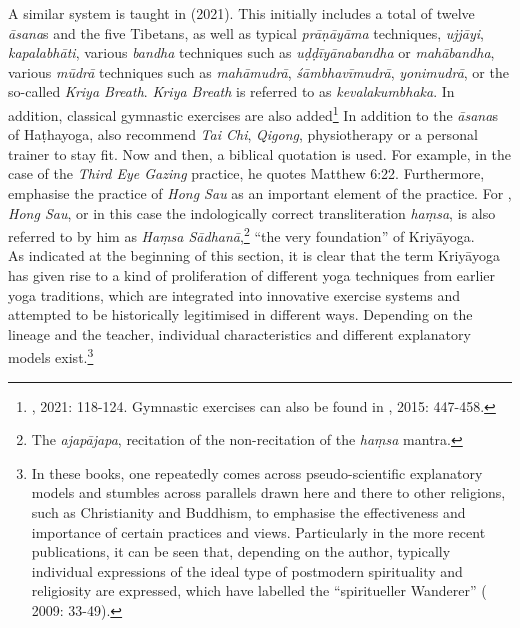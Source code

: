 A similar system is taught in \citeauthor{kriyayogalowenstein} (2021). This initially includes a total of twelve \textit{āsana}s and the five Tibetans, as well as typical \textit{prāṇāyāma} techniques, \textit{ujjāyi}, \textit{kapalabhāti}, various \textit{bandha} techniques such as \textit{uḍḍīyānabandha} or \textit{mahābandha}, various \textit{mūdrā} techniques such as \textit{mahāmudrā}, \textit{śāmbhavīmudrā}, \textit{yonimudrā}, or the so-called \textit{Kriya Breath}. \textit{Kriya Breath} is referred to as \textit{kevalakumbhaka}. In addition, classical gymnastic exercises are also added\footnote{\citeauthor{kriyayogalowenstein}, 2021: 118-124. Gymnastic exercises can also be found in \citeauthor{kriyayogasturgess2015}, 2015: 447-458.} In addition to the \textit{āsana}s of Haṭhayoga, \citeauthor{kriyayogalowenstein} also recommend \textit{Tai Chi}, \textit{Qigong}, physiotherapy or a personal trainer to stay fit. Now and then, a biblical quotation is used. For example, in the case of the \textit{Third Eye Gazing} practice, he quotes Matthew 6:22. Furthermore, \citeauthor{kriyayogalowenstein} emphasise the practice of \textit{Hong Sau} as an important element of the practice. For \citeauthor{kriyayoganityananda2013}, \textit{Hong Sau}, or in this case the indologically correct transliteration \textit{haṃsa}, is also referred to by him as \textit{Haṃsa Sādhanā},\footnote{The \textit{ajapājapa}, recitation of the non-recitation of the \textit{haṃsa} mantra.} ``the very foundation'' of Kriyāyoga.\\

As indicated at the beginning of this section, it is clear that the term Kriyāyoga has given rise to a kind of proliferation of different yoga techniques from earlier yoga traditions, which are integrated into innovative exercise systems and attempted to be historically legitimised in different ways. Depending on the lineage and the teacher, individual characteristics and different explanatory models exist.\footnote{In these books, one repeatedly comes across pseudo-scientific explanatory models and stumbles across parallels drawn here and there to other religions, such as Christianity and Buddhism, to emphasise the effectiveness and importance of certain practices and views. Particularly in the more recent publications, it can be seen that, depending on the author, typically individual expressions of the ideal type of postmodern spirituality and religiosity are expressed, which \citeauthor{bochinger2009} have labelled the ``spiritueller Wanderer'' (\citeauthor{bochinger2009} 2009: 33-49).}\\

